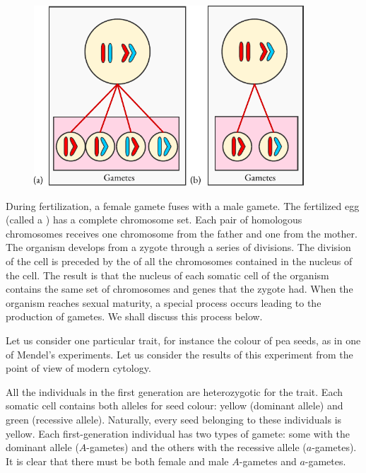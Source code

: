 \begin{figure}[!ht]
\centering
\includegraphics[width=0.9\textwidth]{figures/genes0.pdf}
\end{figure}

During fertilization, a female gamete fuses with a male gamete. The
fertilized egg (called a ) has a complete chromosome set. Each pair of homologous chromosomes receives one chromosome from the father and one from the mother. The organism develops from a zygote through a series of divisions. The division of the cell is preceded by the  of all the chromosomes contained in the nucleus of the cell. The result is that the nucleus of each somatic cell of the organism contains the same set of chromosomes and genes that the zygote had. When the organism reaches sexual maturity, a special process occurs leading to the production of gametes. We shall discuss this process
below.

 Let us consider one particular trait, for
instance the colour of pea seeds, as in one of Mendel's experiments. Let
us consider the results of this experiment from the point of view of
modern cytology.

All the individuals in the first generation are heterozygotic for the
trait. Each somatic cell contains both alleles for seed colour: yellow
(dominant allele) and green (recessive allele). Naturally, every seed
belonging to these individuals is yellow. Each first-generation individual
has two types of gamete: some with the dominant allele ($A$-gametes) and
the others with the recessive allele ($a$-gametes). It is clear that there must
be both female and male $A$-gametes and $a$-gametes.

